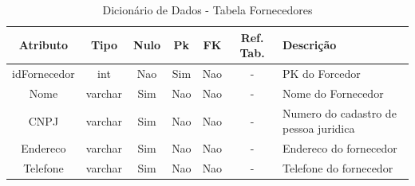 \documentclass[
	12pt,				%
	openright,			%
	oneside,			%
	a4paper,			%
	chapter=TITLE,		%
	section=TITLE,		%
	english,			%
	brazil				%
	]{abntex2}
\begin{document}
    \begin{table}[htbp]
    \centering
        \caption{Dicionário de Dados - Tabela Fornecedores}
        \label{tb1_dicionario_dados_fornecedores}
        \begin{tabular}{|c|c|c|c|c|c|p{3cm}|}
            \hline
            \textbf{Atributo} & 
            \textbf{Tipo} & 
            \textbf{Nulo} & 
            \textbf{Pk} & 
            \textbf{FK} & 
            \textbf{Ref. Tab.} & 
            \textbf{Descrição} \\ \hline
            idFornecedor & int & Nao & Sim & Nao & - & PK do Forcedor \\ \hline
            Nome & varchar & Sim & Nao & Nao & - & Nome do Fornecedor \\ \hline
            CNPJ & varchar & Sim & Nao & Nao & - & Numero do cadastro de pessoa juridica \\ \hline
            Endereco & varchar & Sim & Nao & Nao & - & Endereco do fornecedor \\ \hline
            Telefone & varchar & Sim & Nao & Nao & - & Telefone do fornecedor \\ \hline
        \end{tabular}
    \end{table}
    
\end{document}

